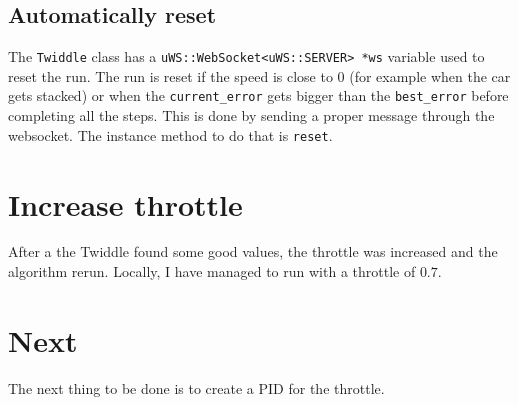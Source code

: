 \documentclass{article}
\let\cd\lstinline
\begin{document}
\subsection{Automatically reset}
The \cd+Twiddle+ class has a  \cd+uWS::WebSocket<uWS::SERVER> *ws+ variable used to reset the run. The run is reset if the speed is close to $0$ (for example when the car gets stacked) or when the \cd+current_error+ gets bigger than the \cd+best_error+ before completing all the steps. This is done by sending a proper message through the websocket. The instance method to do that is \cd+reset+.

\section{Increase throttle}
After a the Twiddle found some good values, the throttle was increased and the algorithm rerun. Locally, I have managed to run with a throttle of $0.7$.

\section{Next}
The next thing to be done is to create a PID for the throttle.
\end{document}
